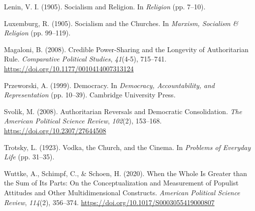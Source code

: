 \documentclass[
  english,
  man]{apa6}
\begin{document}
\leavevmode\hypertarget{ref-leninSocialismReligion1905}{}%
Lenin, V. I. (1905). Socialism and Religion. In \emph{Religion} (pp. 7--10).

\leavevmode\hypertarget{ref-luxemburgSocialismChurches1905}{}%
Luxemburg, R. (1905). Socialism and the Churches. In \emph{Marxism, Socialism \& Religion} (pp. 99--119).

\leavevmode\hypertarget{ref-magaloniCrediblePowerSharingLongevity2008}{}%
Magaloni, B. (2008). Credible Power-Sharing and the Longevity of Authoritarian Rule. \emph{Comparative Political Studies}, \emph{41}(4-5), 715--741. \url{https://doi.org/10.1177/0010414007313124}

\leavevmode\hypertarget{ref-przeworskiDemocracy1999}{}%
Przeworski, A. (1999). Democracy. In \emph{Democracy, Accountability, and Representation} (pp. 10--39). Cambridge University Press.

\leavevmode\hypertarget{ref-svolikAuthoritarianReversalsDemocratic2008}{}%
Svolik, M. (2008). Authoritarian Reversals and Democratic Consolidation. \emph{The American Political Science Review}, \emph{102}(2), 153--168. \url{https://doi.org/10.2307/27644508}

\leavevmode\hypertarget{ref-trotskyVodkaChurchCinema1923}{}%
Trotsky, L. (1923). Vodka, the Church, and the Cinema. In \emph{Problems of Everyday Life} (pp. 31--35).

\leavevmode\hypertarget{ref-wuttkeWhenWholeGreater2020}{}%
Wuttke, A., Schimpf, C., \& Schoen, H. (2020). When the Whole Is Greater than the Sum of Its Parts: On the Conceptualization and Measurement of Populist Attitudes and Other Multidimensional Constructs. \emph{American Political Science Review}, \emph{114}(2), 356--374. \url{https://doi.org/10.1017/S0003055419000807}

\endgroup
\end{document}

